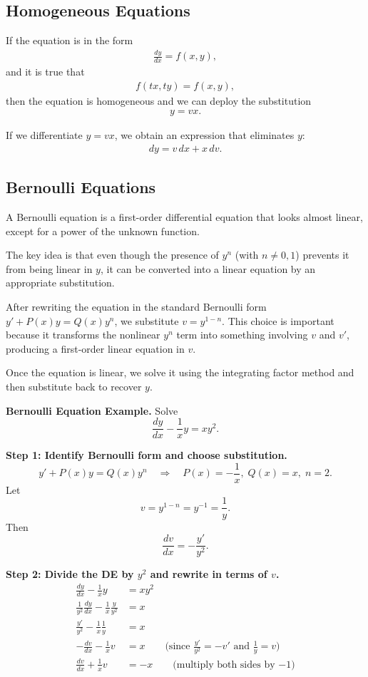 \documentclass[11pt]{article}
\begin{document}
\subsection{Homogeneous Equations}
If the equation is in the form
\begin{align*}
  \frac{dy}{dx} = f(x,y),
\end{align*}
and it is true that
\begin{align*}
  f(tx,ty) = f(x,y),
\end{align*}
then the equation is homogeneous and we can deploy the substitution
\begin{align*}
  y = vx.
\end{align*}

If we differentiate $y=vx$, we obtain an expression that eliminates $y$:
\begin{align*}
  dy = v\,dx + x\,dv.
\end{align*}

\subsection{Bernoulli Equations}
A Bernoulli equation is a first-order differential equation that looks almost linear, except for a power of the unknown function.

The key idea is that even though the presence of $y^n$ (with $n\neq 0,1$) prevents it from being linear in $y$, it can be converted into a linear equation by an appropriate substitution.

After rewriting the equation in the standard Bernoulli form $y' + P(x)y = Q(x)y^n$, we substitute $v = y^{1-n}$. This choice is important because it transforms the nonlinear $y^n$ term into something involving $v$ and $v'$, producing a first-order linear equation in $v$.

Once the equation is linear, we solve it using the integrating factor method and then substitute back to recover $y$.

\noindent\textbf{Bernoulli Equation Example.} Solve
\[
\frac{dy}{dx}-\frac{1}{x}y = x y^{2}.
\]

\noindent\textbf{Step 1: Identify Bernoulli form and choose substitution.}
\[
y' + P(x)y = Q(x)y^n
\quad\Rightarrow\quad
P(x)=-\frac{1}{x},\; Q(x)=x,\; n=2.
\]
Let
\[
v = y^{1-n} = y^{-1}=\frac{1}{y}.
\]
Then
\[
\frac{dv}{dx} = -\frac{y'}{y^{2}}.
\]

\noindent\textbf{Step 2: Divide the DE by $y^{2}$ and rewrite in terms of $v$.}
\begin{align*}
\frac{dy}{dx}-\frac{1}{x}y &= x y^{2} \\
\frac{1}{y^{2}}\frac{dy}{dx}-\frac{1}{x}\frac{y}{y^{2}} &= x \\
\frac{y'}{y^{2}}-\frac{1}{x}\frac{1}{y} &= x \\
-\frac{dv}{dx}-\frac{1}{x}v &= x \qquad\text{(since $\frac{y'}{y^2}=-v'$ and $\frac{1}{y}=v$)}\\
\frac{dv}{dx}+\frac{1}{x}v &= -x \qquad\text{(multiply both sides by $-1$)}
\end{align*}
\end{document}
